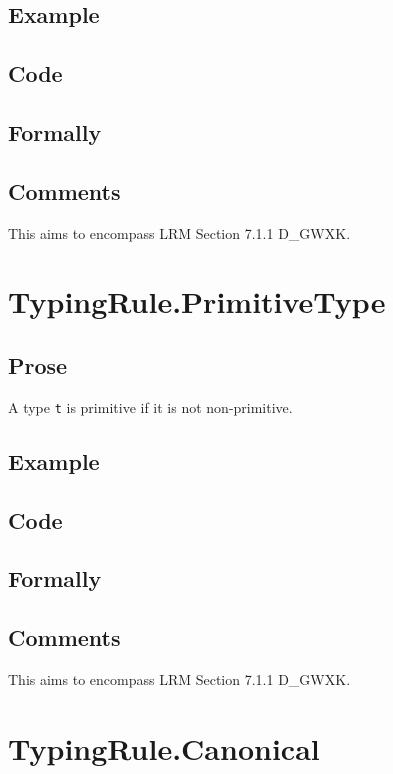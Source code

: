 \documentclass{book}
\begin{document}
    \subsection{Example}

    \subsection{Code}

    \subsection{Formally}

    \subsection{Comments}
    This aims to encompass LRM Section 7.1.1 D\_GWXK.

\section{TypingRule.PrimitiveType}

    \subsection{Prose} 
    A type \texttt{t} is primitive if it is not non-primitive.

    \subsection{Example}

    \subsection{Code}

    \subsection{Formally}

    \subsection{Comments}
    This aims to encompass LRM Section 7.1.1 D\_GWXK.

\section{TypingRule.Canonical}
\end{document}
